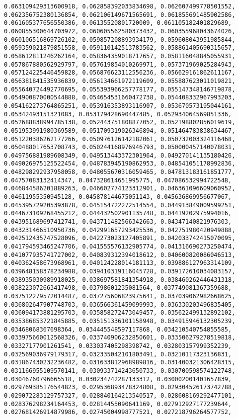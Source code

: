 \documentclass[11pt]{article}
\begin{document}
\begin{Verbatim}[commandchars=\\\{\}]
0.063109429313600918, 0.062858392033834698, 0.062607499778501552, 0.062356752380136854, 0.062106149671565691, 0.061855691485902586, 0.061605377656550386, 0.06135520801720009, 0.061105182401829689, 0.060855300644703972, 0.060605562580373432, 0.060355968043674026, 0.060106516869726102, 0.059857208893934179, 0.059608043951985844, 0.059359021879851558, 0.059110142513783562, 0.058861405690315657, 0.058612811246262164, 0.058364359018717657, 0.058116048845055931, 0.057867880562929797, 0.057619854010269971, 0.057371969025284943, 0.057124225446459828, 0.056876623112556236, 0.056629161862611167, 0.056381841535936839, 0.056134661972119609, 0.055887623011019821, 0.055640724492770695, 0.055393966257778177, 0.055147348146719878, 0.054900870000544888, 0.054654531660472738, 0.054408332967993203, 0.054162273764865251, 0.053916353893116907, 0.053670573195044161, 0.05342493151321083, 0.053179428690447485, 0.052934064569851336, 0.052688838994785138, 0.052443751808877052, 0.052198802856019619, 0.051953991980369589, 0.051709319026346894, 0.051464783838634467, 0.051220386262177266, 0.050976126142182061, 0.050732003324116468, 0.050488017653708743, 0.050244168976946793, 0.050000457140078031, 0.049756881989608349, 0.049513443372301964, 0.049270141135180426, 0.049026975125522454, 0.048783945190862953, 0.048541051178992836, 0.048298292937958058, 0.048055670316059465, 0.047813183161851777, 0.04757083132414347, 0.047328614651995775, 0.047086532994722548, 0.046844586201889263, 0.046602774123312901, 0.046361096609060952, 0.04611955350945128, 0.045878144675051143, 0.045636869956677067, 0.045395729205393878, 0.045154722272514554, 0.044913849009599251, 0.044673109268455212, 0.044432502901135748, 0.04419202975994016, 0.043951689697412741, 0.043711482566342663, 0.04347140821976303, 0.043231466510950736, 0.042991657293425536, 0.042751980420949888, 0.042512435747528096, 0.042273023127405891, 0.042033742415070095, 0.041794593465247706, 0.041555576132905774, 0.041316690273250474, 0.041077935741727002, 0.040839312394018612, 0.040600820086046513, 0.040362458673968961, 0.040124228014181113, 0.039886127963314109, 0.039648158378234988, 0.039410319116045728, 0.039172610034083157, 0.038935030989918025, 0.038697581841354918, 0.038460262446431318, 0.038223072663417498, 0.03798601235081564, 0.037749081367359688, 0.037512279572014487, 0.037275606823975641, 0.037039062982668625, 0.036802647907748703, 0.036566361459099993, 0.036330203496835405, 0.036094173881295703, 0.035858272473049457, 0.035622499132892102, 0.035386853721845885, 0.035151336101158948, 0.034915946132305239, 0.03468068367698364, 0.034445548597117868, 0.034210540754855585, 0.033975660012568326, 0.033740906232850601, 0.033506279278519818, 0.03327177901261541, 0.033037405298398742, 0.032803157999352239, 0.032569036979179317, 0.032335042101803491, 0.03210117323136831, 0.031867430232236482, 0.031633812968989816, 0.031400321306428315, 0.031166955109570141, 0.030933714243650733, 0.030700598574122748, 0.03046760796665518, 0.030234742287133312, 0.030002001401657839, 0.029769385176544823, 0.029536893478324808, 0.029304526173742788, 0.029072283129757327, 0.028840164213540517, 0.028608169292477101, 0.028376298234164453, 0.02814455090641169, 0.027912927177239644, 0.027681426914879986, 0.02745004998777521, 0.027218796264577752, 
\end{Verbatim}
\end{document}
